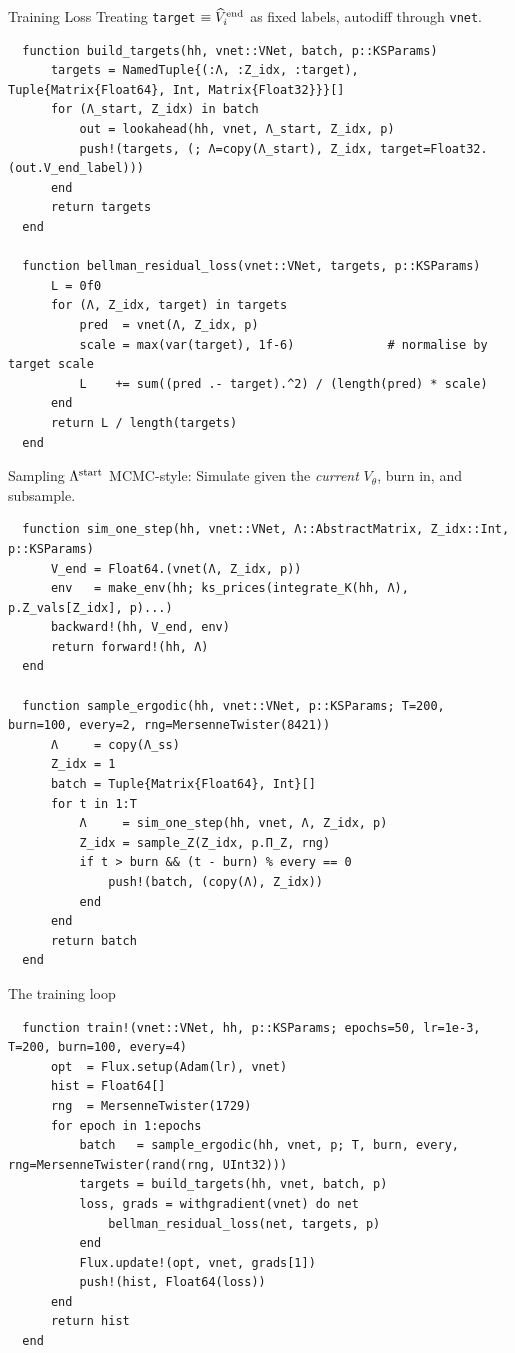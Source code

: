 \documentclass[10pt,aspectratio=169]{beamer}
\begin{document}
\begin{frame}[fragile]{Training Loss}
  Treating \texttt{target} $\equiv \widehat{V}^{\mathrm{end}}_i$ as fixed labels, autodiff through \texttt{vnet}.

  \begin{lstlisting}
  function build_targets(hh, vnet::VNet, batch, p::KSParams)
      targets = NamedTuple{(:Λ, :Z_idx, :target), Tuple{Matrix{Float64}, Int, Matrix{Float32}}}[]
      for (Λ_start, Z_idx) in batch
          out = lookahead(hh, vnet, Λ_start, Z_idx, p)
          push!(targets, (; Λ=copy(Λ_start), Z_idx, target=Float32.(out.V_end_label)))
      end
      return targets
  end

  function bellman_residual_loss(vnet::VNet, targets, p::KSParams)
      L = 0f0
      for (Λ, Z_idx, target) in targets
          pred  = vnet(Λ, Z_idx, p)
          scale = max(var(target), 1f-6)             # normalise by target scale
          L    += sum((pred .- target).^2) / (length(pred) * scale)
      end
      return L / length(targets)
  end
  \end{lstlisting}
\end{frame}

\begin{frame}[fragile]{Sampling $\Lambda^{\mathrm{start}}$}
  MCMC-style: Simulate given the \emph{current} $V_\theta$, burn in, and subsample.

  \begin{lstlisting}
  function sim_one_step(hh, vnet::VNet, Λ::AbstractMatrix, Z_idx::Int, p::KSParams)
      V_end = Float64.(vnet(Λ, Z_idx, p))
      env   = make_env(hh; ks_prices(integrate_K(hh, Λ), p.Z_vals[Z_idx], p)...)
      backward!(hh, V_end, env)
      return forward!(hh, Λ)
  end

  function sample_ergodic(hh, vnet::VNet, p::KSParams; T=200, burn=100, every=2, rng=MersenneTwister(8421))
      Λ     = copy(Λ_ss)
      Z_idx = 1
      batch = Tuple{Matrix{Float64}, Int}[]
      for t in 1:T
          Λ     = sim_one_step(hh, vnet, Λ, Z_idx, p)
          Z_idx = sample_Z(Z_idx, p.Π_Z, rng)
          if t > burn && (t - burn) % every == 0
              push!(batch, (copy(Λ), Z_idx))
          end
      end
      return batch
  end
  \end{lstlisting}
\end{frame}

\begin{frame}[fragile]{The training loop}
  \begin{lstlisting}
  function train!(vnet::VNet, hh, p::KSParams; epochs=50, lr=1e-3, T=200, burn=100, every=4)
      opt  = Flux.setup(Adam(lr), vnet)
      hist = Float64[]
      rng  = MersenneTwister(1729)
      for epoch in 1:epochs
          batch   = sample_ergodic(hh, vnet, p; T, burn, every, rng=MersenneTwister(rand(rng, UInt32)))
          targets = build_targets(hh, vnet, batch, p)
          loss, grads = withgradient(vnet) do net
              bellman_residual_loss(net, targets, p)
          end
          Flux.update!(opt, vnet, grads[1])
          push!(hist, Float64(loss))
      end
      return hist
  end
  \end{lstlisting}
\end{frame}
\end{document}

